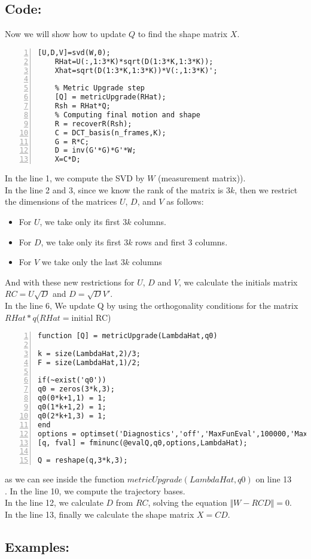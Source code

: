 \subsection{Code:}
\noindent Now we will show how to update $Q$ to find the shape matrix $X$.
\begin{lstlisting}[style=Matlab-editor, numbers=left]
	[U,D,V]=svd(W,0);
	RHat=U(:,1:3*K)*sqrt(D(1:3*K,1:3*K));
	Xhat=sqrt(D(1:3*K,1:3*K))*V(:,1:3*K)';    
	
	% Metric Upgrade step
	[Q] = metricUpgrade(RHat);
	Rsh = RHat*Q;
	% Computing final motion and shape
	R = recoverR(Rsh);
	C = DCT_basis(n_frames,K);
	G = R*C;
	D = inv(G'*G)*G'*W;
	X=C*D;
\end{lstlisting}
\noindent In the line 1, we compute the SVD by $W$ (measurement matrix)).\\
\noindent In the line 2 and 3, since we know the rank of the matrix is $3k$, then we restrict the dimensions of the matrices $U$, $D$, and $V$ as follows:
\begin{itemize}
	\item For $U$, we take only its first $3k$ columns.
	\item For $D$, we take only its first $3k$ rows and first 3 columns.
	\item For $V$ we take only the last $3k$ columns
\end{itemize}
\noindent And with these new restrictions for $U$, $D$ and $V$, we calculate the initials matrix $RC=U\sqrt{D}$ and $D=\sqrt{D}V'$.\\
\noindent In the line 6, We update Q by using the orthogonality conditions for the matrix $RHat*q$($RHat=$initial RC)
\begin{lstlisting}[style=Matlab-editor, numbers=left]
function [Q] = metricUpgrade(LambdaHat,q0)

k = size(LambdaHat,2)/3;
F = size(LambdaHat,1)/2;

if(~exist('q0'))
q0 = zeros(3*k,3);
q0(0*k+1,1) = 1;
q0(1*k+1,2) = 1;
q0(2*k+1,3) = 1;
end
options = optimset('Diagnostics','off','MaxFunEval',100000,'MaxIter',2000,'TolFun',1e-10,'TolX',1e-10);
[q, fval] = fminunc(@evalQ,q0,options,LambdaHat); 

Q = reshape(q,3*k,3);
\end{lstlisting}
as we can see inside the function $metricUpgrade(LambdaHat,q0)$ on line 13\\.
\noindent In the line 10, we compute the trajectory bases.\\
\noindent In the line 12, we calculate $D$ from $RC$, solving the equation $\Vert W-RCD\Vert =0$.\\
\noindent In the line 13, finally we calculate the shape matrix $X=CD$.\\
\subsection{Examples:}